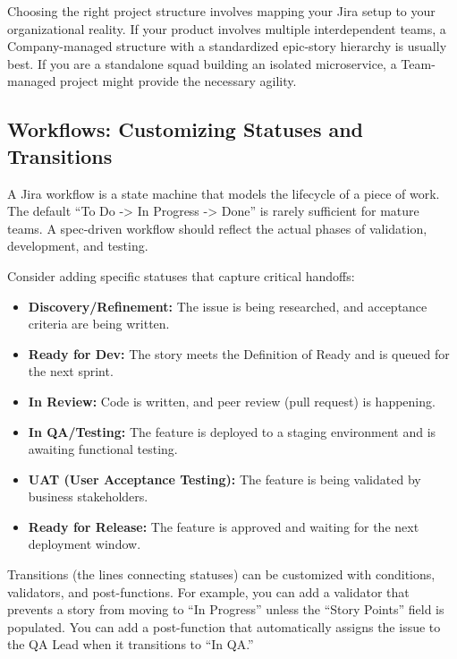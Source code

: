 \documentclass[
  11pt,
  openany,
  oneside]{book}
\providecommand{\tightlist}{%
  \setlength{\itemsep}{0pt}\setlength{\parskip}{0pt}}
\begin{document}
Choosing the right project structure involves mapping your Jira setup to
your organizational reality. If your product involves multiple
interdependent teams, a Company-managed structure with a standardized
epic-story hierarchy is usually best. If you are a standalone squad
building an isolated microservice, a Team-managed project might provide
the necessary agility.

\subsection{Workflows: Customizing Statuses and
Transitions}\label{workflows-customizing-statuses-and-transitions}

A Jira workflow is a state machine that models the lifecycle of a piece
of work. The default ``To Do -\textgreater{} In Progress -\textgreater{}
Done'' is rarely sufficient for mature teams. A spec-driven workflow
should reflect the actual phases of validation, development, and
testing.

Consider adding specific statuses that capture critical handoffs:

\begin{itemize}
\tightlist
\item
  \textbf{Discovery/Refinement:} The issue is being researched, and
  acceptance criteria are being written.
\item
  \textbf{Ready for Dev:} The story meets the Definition of Ready and is
  queued for the next sprint.
\item
  \textbf{In Review:} Code is written, and peer review (pull request) is
  happening.
\item
  \textbf{In QA/Testing:} The feature is deployed to a staging
  environment and is awaiting functional testing.
\item
  \textbf{UAT (User Acceptance Testing):} The feature is being validated
  by business stakeholders.
\item
  \textbf{Ready for Release:} The feature is approved and waiting for
  the next deployment window.
\end{itemize}

Transitions (the lines connecting statuses) can be customized with
conditions, validators, and post-functions. For example, you can add a
validator that prevents a story from moving to ``In Progress'' unless
the ``Story Points'' field is populated. You can add a post-function
that automatically assigns the issue to the QA Lead when it transitions
to ``In QA.''
\end{document}
